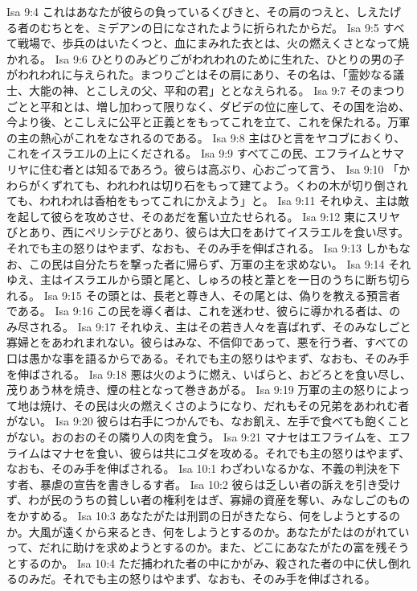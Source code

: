 Isa 9:4  これはあなたが彼らの負っているくびきと、その肩のつえと、しえたげる者のむちとを、ミデアンの日になされたように折られたからだ。
Isa 9:5  すべて戦場で、歩兵のはいたくつと、血にまみれた衣とは、火の燃えくさとなって焼かれる。
Isa 9:6  ひとりのみどりごがわれわれのために生れた、ひとりの男の子がわれわれに与えられた。まつりごとはその肩にあり、その名は、「霊妙なる議士、大能の神、とこしえの父、平和の君」ととなえられる。
Isa 9:7  そのまつりごとと平和とは、増し加わって限りなく、ダビデの位に座して、その国を治め、今より後、とこしえに公平と正義とをもってこれを立て、これを保たれる。万軍の主の熱心がこれをなされるのである。
Isa 9:8  主はひと言をヤコブにおくり、これをイスラエルの上にくだされる。
Isa 9:9  すべてこの民、エフライムとサマリヤに住む者とは知るであろう。彼らは高ぶり、心おごって言う、
Isa 9:10  「かわらがくずれても、われわれは切り石をもって建てよう。くわの木が切り倒されても、われわれは香柏をもってこれにかえよう」と。
Isa 9:11  それゆえ、主は敵を起して彼らを攻めさせ、そのあだを奮い立たせられる。
Isa 9:12  東にスリヤびとあり、西にペリシテびとあり、彼らは大口をあけてイスラエルを食い尽す。それでも主の怒りはやまず、なおも、そのみ手を伸ばされる。
Isa 9:13  しかもなお、この民は自分たちを撃った者に帰らず、万軍の主を求めない。
Isa 9:14  それゆえ、主はイスラエルから頭と尾と、しゅろの枝と葦とを一日のうちに断ち切られる。
Isa 9:15  その頭とは、長老と尊き人、その尾とは、偽りを教える預言者である。
Isa 9:16  この民を導く者は、これを迷わせ、彼らに導かれる者は、のみ尽される。
Isa 9:17  それゆえ、主はその若き人々を喜ばれず、そのみなしごと寡婦とをあわれまれない。彼らはみな、不信仰であって、悪を行う者、すべての口は愚かな事を語るからである。それでも主の怒りはやまず、なおも、そのみ手を伸ばされる。
Isa 9:18  悪は火のように燃え、いばらと、おどろとを食い尽し、茂りあう林を焼き、煙の柱となって巻きあがる。
Isa 9:19  万軍の主の怒りによって地は焼け、その民は火の燃えくさのようになり、だれもその兄弟をあわれむ者がない。
Isa 9:20  彼らは右手につかんでも、なお飢え、左手で食べても飽くことがない。おのおのその隣り人の肉を食う。
Isa 9:21  マナセはエフライムを、エフライムはマナセを食い、彼らは共にユダを攻める。それでも主の怒りはやまず、なおも、そのみ手を伸ばされる。
Isa 10:1  わざわいなるかな、不義の判決を下す者、暴虐の宣告を書きしるす者。
Isa 10:2  彼らは乏しい者の訴えを引き受けず、わが民のうちの貧しい者の権利をはぎ、寡婦の資産を奪い、みなしごのものをかすめる。
Isa 10:3  あなたがたは刑罰の日がきたなら、何をしようとするのか。大風が遠くから来るとき、何をしようとするのか。あなたがたはのがれていって、だれに助けを求めようとするのか。また、どこにあなたがたの富を残そうとするのか。
Isa 10:4  ただ捕われた者の中にかがみ、殺された者の中に伏し倒れるのみだ。それでも主の怒りはやまず、なおも、そのみ手を伸ばされる。
